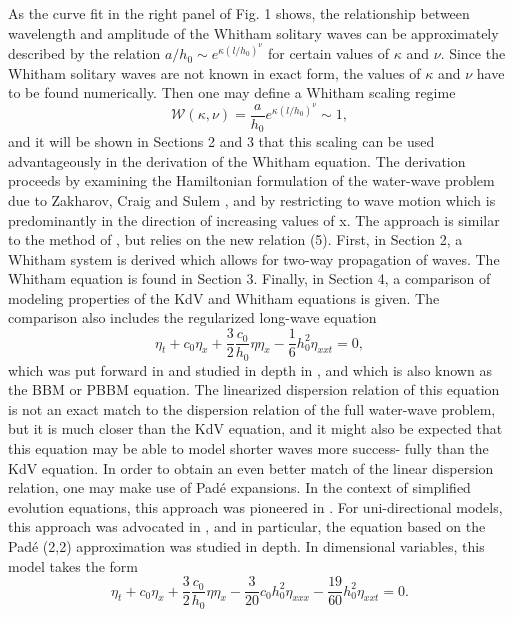 As the curve fit in the right panel of Fig. 1 shows, the relationship
between wavelength and amplitude of the Whitham solitary
waves can be approximately described by the relation $a/h_0 \sim e^{\kappa(l/h_0)^{\nu}}$ for certain values of $\kappa$ and $\nu$. Since the Whitham solitary
waves are not known in exact form, the values of $\kappa$ and $\nu$ have to be
found numerically. Then one may define a Whitham scaling regime
\begin{equation}
\mathcal{W}(\kappa, \nu) = \frac{a}{h_0}e^{\kappa(l/h_0)^{\nu}} \sim 1,
\label{whitham-regime}
\end{equation}
and it will be shown in Sections 2 and 3 that this scaling can be used
advantageously in the derivation of the Whitham equation. The
derivation proceeds by examining the Hamiltonian formulation of
the water-wave problem due to Zakharov, Craig and Sulem \citep{Craig1993, Zakharov1968},
and by restricting to wave motion which is predominantly in the
direction of increasing values of x. The approach is similar to the
method of \cite{Craig1994}, but relies on the new relation (5).
First, in Section 2, a Whitham system is derived which allows for
two-way propagation of waves. The Whitham equation is found in
Section 3. Finally, in Section 4, a comparison of modeling properties
of the KdV and Whitham equations is given. The comparison also
includes the regularized long-wave equation
\begin{equation}
\eta_t + c_0 \eta_x + \frac{3}{2} \frac{c_0}{h_0} \eta \eta_x - \frac{1}{6} h_0^2 \eta_{xxt} = 0,
\label{regularized-long-wave}
\end{equation}
which was put forward in \cite{Peregrine1966} and studied in depth in \cite{Benjamin1972}, and
which is also known as the BBM or PBBM equation. The linearized
dispersion relation of this equation is not an exact match to the
dispersion relation of the full water-wave problem, but it is much
closer than the KdV equation, and it might also be expected that
this equation may be able to model shorter waves more success-
fully than the KdV equation. In order to obtain an even better match
of the linear dispersion relation, one may make use of Pad\'e  expansions. In the context of simplified evolution equations, this
approach was pioneered in \cite{Witting1984}. For uni-directional models, this
approach was advocated in \cite{Fetecau2005}, and in particular, the equation
based on the Pad\'e (2,2) approximation was studied in depth. In dimensional variables, this model takes the form
\begin{equation}
\eta_t + c_0 \eta_x + \frac{3}{2} \frac{c_0}{h_0} \eta \eta_x
- \frac{3}{20} c_0 h_0^2 \eta_{xxx} - \frac{19}{60} h_0^2 \eta_{xxt} = 0.
\label{pade-2-2}
\end{equation}
